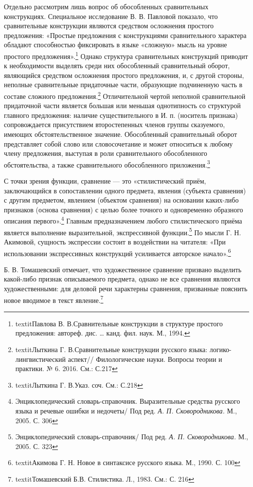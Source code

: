 \documentclass{kursa4}
\begin{document}
{{      Отдельно рассмотрим лишь вопрос об обособленных сравнительных конструкциях. Специальное исследование В. В. Павловой показало, что сравнительные конструкции являются средством осложнения простого предложения: «Простые предложения с конструкциями сравнительного характера обладают способностью фиксировать в языке «сложную» мысль на уровне простого предложения».\footnote{textit{Павлова В. В.}Сравнительные конструкции в структуре простого предложения: автореф. дис. … канд. фил. наук. М., 1994.} Однако структура сравнительных конструкций приводит к необходимости выделять среди них обособленный сравнительный оборот, являющийся средством осложнения простого предложения, и, с другой стороны, неполные сравнительные придаточные части, образующие подчиненную часть в составе сложного предложения.\footnote{textit{Лыткина Г. В.}Сравнительные конструкции русского языка: логико-лингвистический аспект// Филологические науки. Вопросы теории и практики. № 6. 2016. См.: С.217} Отличительной чертой неполной сравнительной придаточной части является большая или меньшая однотипность со структурой главного предложения: наличие существительного в И. п. (носитель признака) сопровождается присутствием второстепенных членов группы сказуемого, имеющих обстоятельственное значение.  Обособленный сравнительный оборот представляет собой слово или словосочетание и может относиться к любому члену предложения, выступая в роли сравнительного обособленного обстоятельства, а также сравнительного обособленного приложения.\footnote{textit{Лыткина Г. В.}Указ. соч. См.: С.218} 

      С точки зрения функции, сравнение — это «стилистический приём, заключающийся в сопоставлении одного предмета, явления (субъекта сравнения) с другим предметом, явлением (объектом сравнения) на основании каких-либо признаков (основа сравнения) с целью более точного и одновременно образного описания первого».\footnote{Энциклопедический словарь-справочник. Выразительные средства русского языка и речевые ошибки и недочеты/ Под ред. \textit{А. П. Сковородникова.} М., 2005. С. 306} Главным предназначением любого стилистического приёма является выполнение выразительной, экспрессивной функции.\footnote{Энциклопедический словарь-справочник/ Под ред. \textit{А. П. Сковородникова.} М., 2005. С. 323} По мысли Г. Н. Акимовой, сущность экспрессии  состоит в воздействии на читателя: «При использовании экспрессивных конструкций усиливается авторское начало».\footnote{textit{Акимова Г. Н.} Новое в синтаксисе русского языка. М., 1990. С. 100} 

      Б. В. Томашевский отмечает, что художественное сравнение призвано выделить какой-либо признак описываемого предмета, однако не все сравнения являются художественными: для деловой речи характерны сравнения, призванные  пояснить новое вводимое в текст явление.\footnote{textit{Томашевский Б.В.} Стилистика. Л., 1983. См.: С. 216} 

}}
\end{document}
